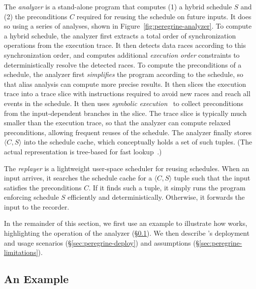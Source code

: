 The \emph{analyzer} is a stand-alone program that computes (1) a hybrid
schedule $S$ and (2) the preconditions $C$ required for reusing the schedule on
future inputs.  It does so using a series of analyses, shown in
Figure~\ref{fig:peregrine-analyzer}.  To compute a hybrid schedule, the analyzer
first extracts a total order of synchronization operations from the
execution trace.  It then detects data races according to this
synchronization order, and computes additional \emph{execution order} constraints
to deterministically resolve the detected races.
To compute the preconditions of a schedule, the analyzer first
\emph{simplifies} the program according to the schedule, so that alias
analysis can compute more precise results.  
It then slices the execution trace into a trace slice with instructions
required to avoid new races and reach all events in the schedule.  It
then uses \emph{symbolic execution}~\cite{symbolic-execution} to
collect preconditions from the input-dependent branches in the slice.
The trace slice is typically much smaller than the execution trace, so
that the analyzer can compute relaxed preconditions, allowing frequent
reuses of the schedule.  The analyzer finally stores $\langle C, S
\rangle$ into the schedule cache, which conceptually holds a set of such
tuples. (The actual representation is tree-based for fast
lookup~\cite{cui:tern:osdi10}.)



The \emph{replayer} is a lightweight user-space scheduler for reusing
schedules.  When an input arrives, it searches the schedule cache for a
$\langle C, S \rangle$ tuple such that the input satisfies the
preconditions $C$.  If it finds such a tuple, it simply runs the program
enforcing schedule $S$ efficiently and deterministically.  Otherwise,
it forwards the input to the recorder.

In the remainder of this section, we first use an example to illustrate
how \peregrine works, highlighting the operation of the analyzer
(\S\ref{sec:peregrine-example}).  We then describe \peregrine's deployment and usage
scenarios (\S\ref{sec:peregrine-deploy}) and assumptions (\S\ref{sec:peregrine-limitations}).

\subsection{An Example} \label{sec:peregrine-example}


